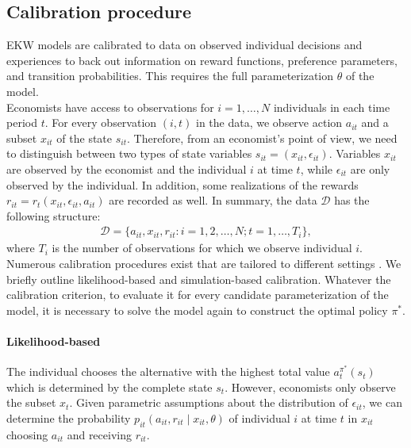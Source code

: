 \subsection{Calibration procedure}
EKW models are calibrated to data on observed individual decisions and experiences to back out information on reward functions, preference parameters, and transition probabilities.  This requires the full parameterization $\theta$ of the model.\\

\noindent Economists have access to observations for $i = 1, \hdots, N$ individuals in each time period $t$. For every observation $(i, t)$ in the data, we observe action $a_{it}$ and a subset $x_{it}$ of the state $s_{it}$. Therefore, from an economist's point of view, we need to distinguish between two types of state variables $s_{it} = (x_{it}, \epsilon_{it})$. Variables $x_{it}$ are observed by the economist and the individual $i$ at time $t$, while $\epsilon_{it}$ are only observed by the individual. In addition, some realizations of the rewards $r_{it} = r_t(x_{it}, \epsilon_{it}, a_{it})$ are recorded as well. In summary, the data $\mathcal{D}$ has the following structure:
%
\begin{align*}
  \mathcal{D} = \{a_{it}, x_{it}, r_{it}: i = 1,2, \hdots, N; t = 1, \hdots, T_i\},
\end{align*}
where $T_i$ is the number of observations for which we observe individual $i$.\\

\noindent Numerous calibration procedures exist that are tailored to different settings \citep{Davidson.2003, Gourieroux.1996}. We briefly outline likelihood-based and simulation-based calibration. Whatever the calibration criterion, to evaluate it for every candidate parameterization of the model, it is necessary to solve the model again to construct the optimal policy $\pi^*$.

\paragraph{Likelihood-based} The individual chooses the alternative with the highest total value $a_t^{\pi^*}(s_t)$ which is determined by the complete state $s_t$. However, economists only observe the subset $x_t$. Given parametric assumptions about the distribution of $\epsilon_{it}$, we can determine the probability $p_{it}(a_{it}, r_{it} \mid x_{it}, \theta)$ of individual $i$ at time $t$ in $x_{it}$ choosing $a_{it}$ and receiving $r_{it}$.\\


